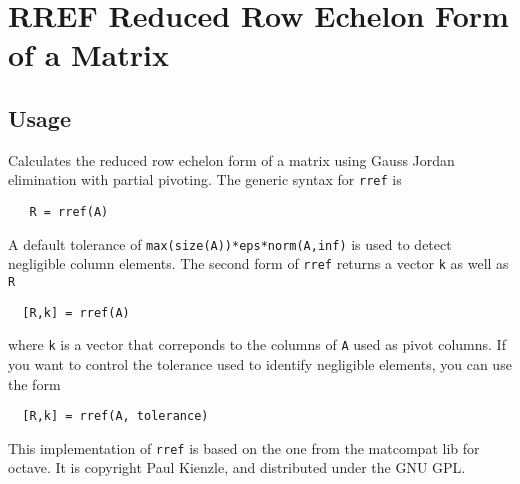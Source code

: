\section{RREF Reduced Row Echelon Form of a Matrix}

\subsection{Usage}

Calculates the reduced row echelon form of a matrix using Gauss
Jordan elimination with partial pivoting.  The generic syntax
for \verb|rref| is 
\begin{verbatim}
   R = rref(A)
\end{verbatim}
A default tolerance of \verb|max(size(A))*eps*norm(A,inf)| is used to
detect negligible column elements.  The second form of \verb|rref| 
returns a vector \verb|k| as well as \verb|R|
\begin{verbatim}
  [R,k] = rref(A)
\end{verbatim}
where \verb|k| is a vector that correponds to the columns of \verb|A| 
used as pivot columns.  If you want to control the tolerance
used to identify negligible elements, you can use the form
\begin{verbatim}
  [R,k] = rref(A, tolerance)
\end{verbatim}
This implementation of \verb|rref| is based on the one from 
the matcompat lib for octave.  It is copyright Paul Kienzle,
and distributed under the GNU GPL. 
